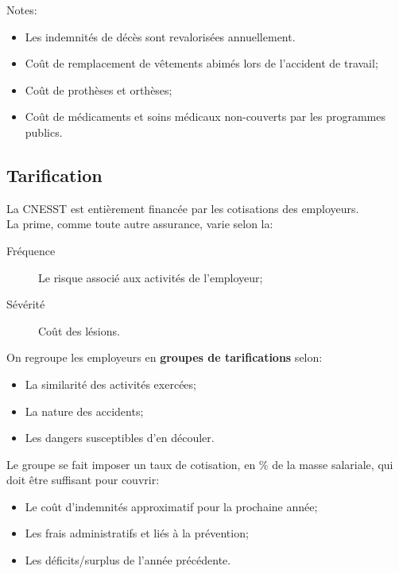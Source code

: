 \documentclass[10pt, french]{article}
\begin{document}
\begin{multicols*}{3}
\begin{definitionNOHFILL}
Notes:
\begin{itemize}
	\item	Les indemnités de décès sont revalorisées annuellement.
\end{itemize}
\end{definitionNOHFILL}

\begin{definitionNOHFILL}
\begin{itemize}[leftmargin = *]
	\item	Coût de remplacement de vêtements abimés lors de l'accident de travail;
	\item	Coût de prothèses et orthèses;
	\item	Coût de médicaments et soins médicaux non-couverts par les programmes publics.
\end{itemize}
\end{definitionNOHFILL}


\columnbreak
\subsection{Tarification}
La CNESST est entièrement financée par les cotisations des employeurs.\\

La prime, comme toute autre assurance, varie selon la:
\begin{description}
	\item[Fréquence]	Le risque associé aux activités de l'employeur;
	\item[Sévérité]	Coût des lésions.
\end{description}

On regroupe les employeurs en \textbf{groupes de tarifications} selon: 
\begin{itemize}[leftmargin = *]
	\item	La similarité des activités exercées;
	\item	La nature des accidents;
	\item	Les dangers susceptibles d'en découler.
\end{itemize}

Le groupe se fait imposer un taux de cotisation, en \% de la masse salariale, qui doit être suffisant pour couvrir:
\begin{itemize}[leftmargin = *]
	\item	Le coût d'indemnités approximatif pour la prochaine année;
	\item	Les frais administratifs et liés à la prévention;
	\item	Les déficits/surplus de l'année précédente.
\end{itemize}


\end{multicols*}
\end{document}
